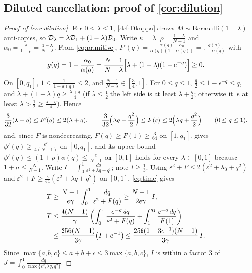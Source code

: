\subsection{Diluted cancellation: proof of \texorpdfstring{\cref{cor:dilution}}{the dilution corollary}}
\label{app:dilution}
\begin{proof}[Proof of \cref{cor:dilution}]
For $0\le\lambda\le1$, \cref{def:Dkappa} draws $M\sim\mathrm{Bernoulli}(1-\lambda)$ anti-copies, so $\mathcal D_{\lambda}=\lambda\mathcal D_{1}+(1-\lambda)\mathcal D_{0}$.
Write $\kappa=\lambda$, $\rho=\tfrac{1-\lambda}{N-1}$ and $\alpha_0=\tfrac{\rho}{1+\rho}=\tfrac{1-\lambda}{N-\lambda}$.
From \cref{eq:primitive}, $F'(q)=\tfrac{\alpha(q)-\alpha_0}{\alpha(q)(1-\alpha(q))}=\tfrac{g(q)}{1-\alpha(q)}$ with
\[
 g(q)=1-\frac{\alpha_0}{\alpha(q)}=\frac{N-1}{N-\lambda}\Bigl[\lambda+(1-\lambda)(1-e^{-q})\Bigr]\ge0 .
\]
On $[0,q_1]$, $1\le\tfrac{1}{1-\alpha(q)}\le2$, and $\tfrac{N-1}{N-\lambda}\in[\tfrac{3}{4},1]$. For $0\le q\le1$, $\tfrac{q}{2}\le1-e^{-q}\le q$, and
$\lambda+(1-\lambda)q\ge\tfrac{\lambda+q}{4}$ (if $\lambda\le\tfrac12$ the left side is at least $\lambda+\tfrac{q}{2}$; otherwise it is at least $\lambda>\tfrac12\ge\tfrac{\lambda+q}{4}$). Hence
\[
 \frac{3}{32}(\lambda+q)\le F'(q)\le2(\lambda+q),\qquad
 \frac{3}{32}\Bigl(\lambda q+\frac{q^2}{2}\Bigr)\le F(q)\le2\Bigl(\lambda q+\frac{q^2}{2}\Bigr)\qquad(0\le q\le1),
\]
and, since $F$ is nondecreasing, $F(q)\ge F(1)\ge\tfrac{3}{64}$ on $[1,q_1]$.
 gives $\phi'(q)\ge\tfrac{e^q}{4(N-1)}$ on $[0,q_1]$, and its upper bound $\phi'(q)\le(1+\rho)\alpha(q)\le\tfrac{e}{N-1}$ on $[0,1]$ holds for every $\lambda\in[0,1]$ because $1+\rho\le\tfrac{N}{N-1}$.
Write $I=\int_0^1\tfrac{dq}{\varepsilon^2+\lambda q+q^2}$; note $I\ge\tfrac{1}{3}$. Using $\varepsilon^2+F\le2(\varepsilon^2+\lambda q+q^2)$ and $\varepsilon^2+F\ge\tfrac{3}{64}(\varepsilon^2+\lambda q+q^2)$ on $[0,1]$, \cref{eq:time} gives
\begin{align*}
 T&\ge\frac{N-1}{e\gamma}\int_0^1\frac{dq}{\varepsilon^2+F(q)}\ge\frac{N-1}{2e\gamma}\,I,\\
 T&\le\frac{4(N-1)}{\gamma}\left(\int_0^1\frac{e^{-q}\,dq}{\varepsilon^2+F(q)}+\int_1^{q_1}\frac{e^{-q}\,dq}{F(1)}\right)\\
 &\le\frac{256(N-1)}{3\gamma}\bigl(I+e^{-1}\bigr)\le\frac{256(1+3e^{-1})(N-1)}{3\gamma}\,I .
\end{align*}
Since $\max\{a,b,c\}\le a+b+c\le3\max\{a,b,c\}$, $I$ is within a factor $3$ of $J=\int_0^1\tfrac{dq}{\max\{\varepsilon^2,\lambda q,q^2\}}$.

\end{proof}
